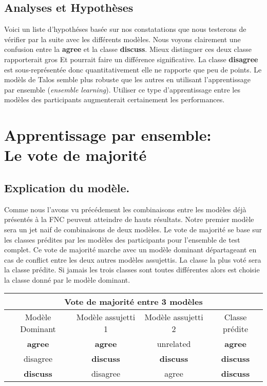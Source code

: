 \documentclass[onecolumn, 12pt]{article}
\begin{document}
\subsection{Analyses et Hypothèses}
Voici un liste d'hypothéses basée sur nos constatations que nous testerons de vérifier par la suite avec les différents modèles.
Nous voyons clairement une confusion entre la \textbf{agree} et la classe \textbf{discuss}.
Mieux distinguer ces deux classe rapporterait gros Et pourrait faire un différence significative.
La classe \textbf{disagree} est sous-représentée donc quantitativement elle ne rapporte que peu de points.
Le modèls de Talos semble plus robuste que les autres en utilisant l'apprentissage par ensemble (\textit{ensemble learning}).
Utiliser ce type d'apprentissage entre les modèles des participants augmenterait certainement les performances.

\section{Apprentissage par ensemble: \\ Le vote de majorité}
\subsection{Explication du modèle.}
Comme nous l'avons vu précédement les combinaisons entre les modèles déjà présentés à la FNC peuvent atteindre de hauts résultats.
Notre premier modèle sera un jet naif de combinaisons de deux modèles.
Le vote de majorité se base sur les classes prédites par les modèles des participants pour l'ensemble de test complet.
Ce vote de majorité marche avec un modèle dominant départageant en cas de conflict entre les deux autres modèles assujettis.
La classe la plus voté sera la classe prédite.
Si jamais les trois classes sont toutes différentes alors est choisie la classe donné par le modèle dominant.

\begin{center}
 \begin{tabular}{  c c c || c  }
  \multicolumn{4}{c}{Vote de majorité entre 3 modèles}                          \\
  \hline
  Modèle Dominant  & Modèle assujetti 1 & Modèle assujetti 2 & Classe prédite   \\
  \hline
  \textbf{agree}   & \textbf{agree}     & unrelated          & \textbf{agree}   \\
  disagree         & \textbf{discuss}   & \textbf{discuss}   & \textbf{discuss} \\
  \textbf{discuss} & disagree           & agree              & \textbf{discuss} \\
 \end{tabular}
\end{center}
\end{document}
